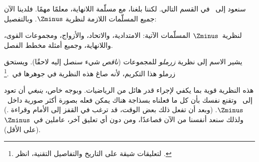 \documentclass[../../../include/open-logic-section]{subfiles}
\begin{document}

سنعود إلى~\stagesinf{} في القسم التالي. لكننا بلغنا، مع مسلّمة
اللانهاية، معلمًا مهمًا. فلدينا الآن جميع المسلّمات اللازمة لنظرية
$\Zminus$. وبالتفصيل:

\begin{defn}
لنظرية~$\Zminus$ المسلّمات الآتية: الامتدادية، والاتحاد، والأزواج،
ومجموعات القوى، واللانهاية، وجميع أمثلة مخطط الفصل.
\end{defn}

يشير الاسم إلى نظرية \emph{زرملو} للمجموعات (\emph{ناقص} شيء سنصل
إليه لاحقًا). ويستحق زرملو هذا التكريم، لأنه صاغ هذه النظرية في جوهرها
في~\citeyear{Zermelo1908Untersuchungen}.\footnote{لتعليقات شيقة على
  التاريخ والتفاصيل التقنية، انظر
  \citet[Appendix A]{Potter2004}.}

هذه النظرية قوية بما يكفي لإجراء قدر هائل من الرياضيات. وبوجه خاص،
\emph{ينبغي} أن تعود إلى~ وتقنع نفسك بأن كل ما
فعلناه بسذاجة هناك يمكن فعله بصورة أكثر صورية داخل~$\Zminus$.
(وبعد أن تفعل ذلك بعض الوقت، قد ترغب في القفز إلى الأمام وقراءة
.) ولذلك سنعد أنفسنا من الآن
فصاعدًا، ومن دون أي تعليق آخر، عاملين في~$\Zminus$ (على الأقل).
\end{document}
